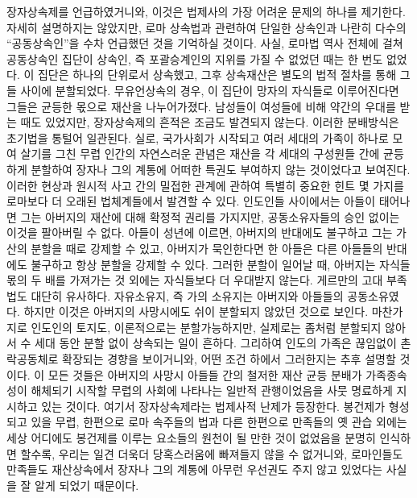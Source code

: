 장자상속제를 언급하였거니와,
이것은 법제사의 가장 어려운 문제의 하나를 제기한다.
자세히 설명하지는 않았지만,
로마 상속법과 관련하여
단일한 상속인과 나란히
다수의 ``공동상속인''을
수차
언급했던 것을 기억하실 것이다.
사실, 로마법 역사 전체에 걸쳐
공동상속인 집단이 상속인, 즉 포괄승계인의 지위를
가질 수 없었던 때는 한 번도 없었다.
이 집단은 하나의 단위로서 상속했고,
그후 상속재산은 별도의 법적 절차를 통해 그들 사이에 분할되었다.
무유언상속의 경우,
이 집단이 망자의 자식들로 이루어진다면
그들은 균등한 몫으로 재산을 나누어가졌다.
남성들이 여성들에 비해 약간의 우대를 받는 때도 있었지만,
장자상속제의 흔적은 조금도 발견되지 않는다.
이러한 분배방식은 초기법을 통털어 일관된다.
실로, 국가사회가 시작되고
여러 세대의 가족이 하나로 모여 살기를 그친 무렵
인간의 자연스러운 관념은
재산을 각 세대의 구성원들 간에 균등하게 분할하여
장자나 그의 계통에 어떠한 특권도 부여하지 않는 것이었다고 보여진다.
이러한 현상과
원시적 사고 간의
밀접한 관계에 관하여
특별히 중요한 힌트 몇 가지를
로마보다 더 오래된 법체계들에서 발견할 수 있다.
인도인들 사이에서는 아들이 태어나면
그는 아버지의 재산에 대해 확정적 권리를 가지지만,
공동소유자들의 승인 없이는 이것을 팔아버릴 수 없다.
아들이 성년에 이르면,
아버지의 반대에도 불구하고
그는 가산의 분할을 때로 강제할 수 있고,
아버지가 묵인한다면
한 아들은 다른 아들들의 반대에도 불구하고
항상 분할을 강제할 수 있다.
그러한 분할이 일어날 때,
아버지는
자식들 몫의 두 배를 가져가는 것 외에는
자식들보다 더 우대받지 않는다.
게르만의 고대 부족법도 대단히 유사하다.
자유소유지, 즉 가의 소유지는
아버지와 아들들의 공동소유였다.
하지만 이것은 아버지의 사망시에도 쉬이 분할되지 않았던 것으로 보인다.
마찬가지로 인도인의 토지도,
이론적으로는 분할가능하지만,
실제로는 좀처럼 분할되지 않아서
수 세대 동안 분할 없이 상속되는 일이 흔하다.
그리하여
인도의 가족은 끊임없이 촌락공동체로
확장되는 경향을 보이거니와,
어떤 조건 하에서 그러한지는
추후 설명할 것이다.
이 모든 것들은
아버지의 사망시 아들들 간의 철저한 재산 균등 분배가
가족종속성이 해체되기 시작할 무렵의 사회에 나타나는
일반적 관행이었음을
사뭇 명료하게 지시하고 있는 것이다.
여기서 장자상속제라는 법제사적 난제가 등장한다.
봉건제가 형성되고 있을 무렵,
한편으로 로마 속주들의 법과 다른 한편으로 만족들의 옛 관습 외에는
세상 어디에도 봉건제를 이루는 요소들의 원천이 될 만한 것이 없었음을
분명히 인식하면 할수록,
우리는 일견 더욱더 당혹스러움에 빠져들지 않을 수 없거니와,
로마인들도 만족들도 재산상속에서 장자나 그의 계통에
아무런 우선권도 주지 않고 있었다는 사실을 잘 알게 되었기 때문이다.

